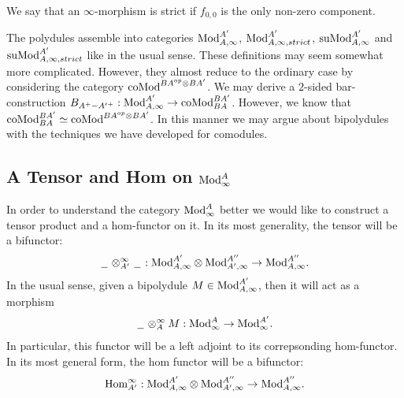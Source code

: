 \documentclass[../thesis.tex]{subfiles}
\begin{document}
            We say that an $\infty$-morphism is strict if $f_{0,0}$ is the only non-zero component.

            The polydules assemble into categories $\tt{Mod}_{A,\infty}^{A'}$, $\tt{Mod}_{A,\infty,strict}^{A'}$, $\tt{suMod}_{A,\infty}^{A'}$ and $\tt{suMod}_{A,\infty,strict}^{A'}$ like in the usual sense. These definitions may seem somewhat more complicated. However, they almost reduce to the ordinary case by considering the category $\tt{coMod}^{BA^{op}\otimes BA'}$. We may derive a $2$-sided bar-construction $B_{A^+-{A'}^+} : \tt{Mod}_{A,\infty}^{A'} \rightarrow \tt{coMod}^{BA'}_{BA}$. However, we know that $\tt{coMod}_{BA}^{BA'} \simeq \tt{coMod}^{BA^{op}\otimes BA'}$. In this manner we may argue about bipolydules with the techniques we have developed for comodules.

        \subsection{A Tensor and Hom on $\tt{Mod}_\infty^A$}

            In order to understand the category $\tt{Mod}_\infty^A$ better we would like to construct a tensor product and a hom-functor on it. In its most generality, the tensor will be a bifunctor:
            \begin{align*}
                \argument \otimes^\infty_{A'} \argument : \tt{Mod}_{A,\infty}^{A'} \otimes \tt{Mod}_{A',\infty}^{A''} \rightarrow \tt{Mod}_{A,\infty}^{A''}\tt{.}
            \end{align*}
            In the usual sense, given a bipolydule $M \in \tt{Mod}_{A,\infty}^{A'}$, then it will act as a morphism
            \begin{align*}
                \argument \otimes_A^\infty M : \tt{Mod}_\infty^A \rightarrow \tt{Mod}_\infty^{A'}\tt{.}
            \end{align*}
            In particular, this functor will be a left adjoint to its correpsonding hom-functor. In its most general form, the hom functor will be a bifunctor:
            \begin{align*}
                \tt{Hom}^\infty_{A'} : \tt{Mod}_{A,\infty}^{A'}\otimes\tt{Mod}_{A',\infty}^{A''} \rightarrow \tt{Mod}_{A,\infty}^{A''}\tt{.}
            \end{align*}
\end{document}
